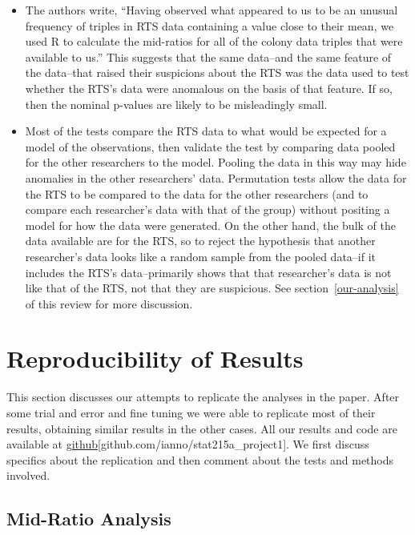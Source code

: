 \documentclass{article}
\begin{document}
\begin{itemize}
\item
  The authors write, “Having observed what appeared to us to be an unusual frequency of triples in RTS data containing a value close to their mean, we used R to calculate the mid-ratios for all of the colony data triples that were available to us.” This suggests that the same data--and the same feature of the data--that raised their suspicions about the RTS was the data used to test whether the RTS's data were anomalous on the basis of that feature. If so, then the nominal p-values are likely to be misleadingly small.
\item
  Most of the tests compare the RTS data to what would be expected for a model of the observations, then validate the test by comparing data pooled for the other researchers to the model. Pooling the data in this way may hide anomalies in the other researchers' data. Permutation tests allow the data for the RTS to be compared to the data for the other researchers (and to compare each researcher's data with that of the group) without positing a model for how the data were generated. On the other hand, the bulk of the data available are for the RTS, so to reject the hypothesis that another researcher's data looks like a random sample from the pooled data--if it includes the RTS's data--primarily shows that that researcher's data is not like that of the RTS, not that they are suspicious. See section~\ref{our-analysis} of this review for more discussion.
\end{itemize}

    \section{Reproducibility of Results}\label{reproducibility-of-results}

This section discusses our attempts to replicate the analyses in the paper. 
After some trial and error and fine tuning we were able to replicate most of
their results, obtaining similar results in the other cases. All our
results and code are available at \hyperlink{https://github.com/ianno/stat215a_project1}{github}[github.com/ianno/stat215a\_project1]. We first discuss specifics about the replication and then comment about the tests and methods involved.


    \subsection{Mid-Ratio Analysis}\label{mid-ratio-analysis}
\end{document}
